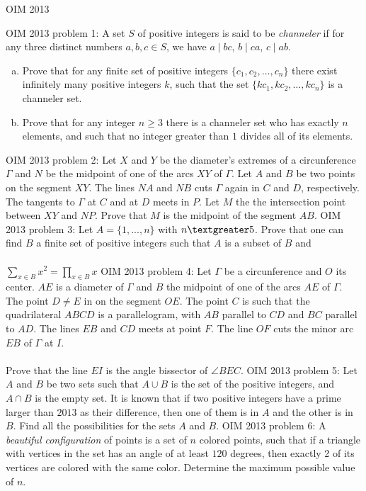 OIM 2013 

OIM 2013 problem 1:  A set $S$ of positive integers is said to be \textit{channeler} if for any three distinct numbers $a,b,c \in S$, we have $a\mid bc$, $b\mid ca$, $c\mid ab$.
\begin{enumerate}[a)]
  \item Prove that for any finite set of positive integers $ \{ c_1, c_2, \ldots, c_n \} $ there exist infinitely many positive integers $k$, such that the set $ \{ kc_1, kc_2, \ldots, kc_n \} $ is a channeler set.
  \item Prove that for any integer $n \ge 3$ there is a channeler set who has exactly $n$ elements, and such that no integer greater than $1$ divides all of its elements.
\end{enumerate} 
OIM 2013 problem 2:  Let $X$ and $Y$ be the diameter's extremes of a circunference $\Gamma$ and $N$ be the midpoint of one of the arcs $XY$ of $\Gamma$. Let $A$ and $B$ be two points on the segment $XY$. The lines $NA$ and $NB$ cuts $\Gamma$ again in $C$ and $D$, respectively.  The tangents to $\Gamma$ at $C$ and at $D$ meets in $P$. Let $M$ the the intersection point between $XY$ and $NP$. Prove that $M$ is the midpoint of the segment $AB$. 
OIM 2013 problem 3:  Let $A = \{1,...,n\}$ with $n \textgreater 5$. Prove that one can find $B$ a finite set of positive integers such that $A$ is a subset of $B$ and \\\\
$\displaystyle\sum_{x \in B} x^2 = \displaystyle\prod_{x \in B} x$ 
OIM 2013 problem 4:  Let $\Gamma$ be a circunference and $O$ its center. $AE$ is a diameter of $\Gamma$ and $B$ the midpoint of one of the arcs $AE$ of $\Gamma$. The point $D \ne E$ in on the segment $OE$. The point $C$ is such that the quadrilateral $ABCD$ is a parallelogram, with $AB$ parallel to $CD$ and $BC$ parallel to $AD$. The lines $EB$ and $CD$ meets at point $F$. The line $OF$ cuts the minor arc $EB$ of $\Gamma$ at $I$. \\\\
Prove that the line $EI$ is the angle bissector of $\angle BEC$. 
OIM 2013 problem 5:  Let $A$ and $B$ be two sets such that $A \cup B$ is the set of the positive integers, and $A \cap B$ is the empty set. It is known that if two positive integers have a prime larger than $2013$ as their difference, then one of them is in $A$ and the other is in $B$. Find all the possibilities for the sets $A$ and $B$. 
OIM 2013 problem 6:  A \textit{beautiful configuration} of points is a set of $n$ colored points, such that if a triangle with vertices in the set has an angle of at least $120$ degrees, then exactly 2 of its vertices are colored with the same color. Determine the maximum possible value of $n$. 

